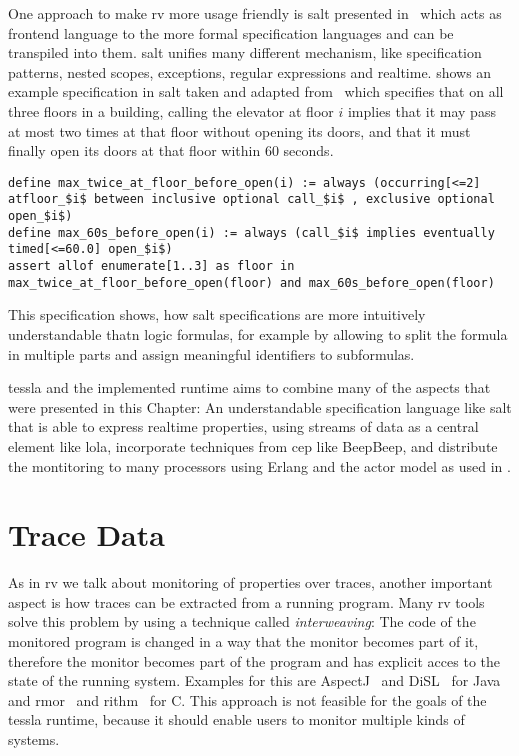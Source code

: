 One approach to make \gls{rv} more usage friendly is \gls{salt} presented in~\cite{Bauer2006} which acts as frontend language to the more formal specification languages and can be transpiled into them.
\Gls{salt} unifies many different mechanism, like specification patterns, nested scopes, exceptions, regular expressions and realtime.
 shows an example specification in \gls{salt} taken and adapted from~\cite{Dwyer1999} which specifies that on all three floors in a building, calling the elevator at floor \(\mathit{i}\) implies that it may pass at most two times at that floor without opening its doors, and that it must finally open its doors at that floor within 60 seconds.

\begin{lstlisting}[float,breaklines=true,label=listing:salt_example,caption={[Example \gls{salt} specification with realtime operators]An example specification in the \gls{salt} language taken from \cite{Bauer2006} defining behaviour of an elevator.}]
define max_twice_at_floor_before_open(i) := always (occurring[<=2] atfloor_$i$ between inclusive optional call_$i$ , exclusive optional open_$i$)
define max_60s_before_open(i) := always (call_$i$ implies eventually timed[<=60.0] open_$i$)
assert allof enumerate[1..3] as floor in max_twice_at_floor_before_open(floor) and max_60s_before_open(floor)
\end{lstlisting}

This specification shows, how \gls{salt} specifications are more intuitively understandable thatn logic formulas, for example by allowing to split the formula in multiple parts and assign meaningful identifiers to subformulas.

\Gls{tessla} and the implemented runtime aims to combine many of the aspects that were presented in this Chapter: An understandable specification language like \gls{salt} that is able to express realtime properties, using streams of data as a central element like \gls{lola}, incorporate techniques from \gls{cep} like BeepBeep, and distribute the montitoring to many processors using Erlang and the actor model as used in \cite{Attard2016}.

\section{Trace Data}
\label{sec:related:traces}

As in \gls{rv} we talk about monitoring of properties over traces, another important aspect is how traces can be extracted from a running program.
Many \gls{rv} tools solve this problem by using a technique called \emph{interweaving}: The code of the monitored program is changed in a way that the monitor becomes part of it, therefore the monitor becomes part of the program and has explicit acces to the state of the running system.
Examples for this are AspectJ~\cite{Kiczales2001} and DiSL~\cite{Marek2012} for Java and \gls{rmor}~\cite{Havelund2008} and \gls{rithm}~\cite{Navabpour2013} for C.
This approach is not feasible for the goals of the \gls{tessla} runtime, because it should enable users to monitor multiple kinds of systems.

